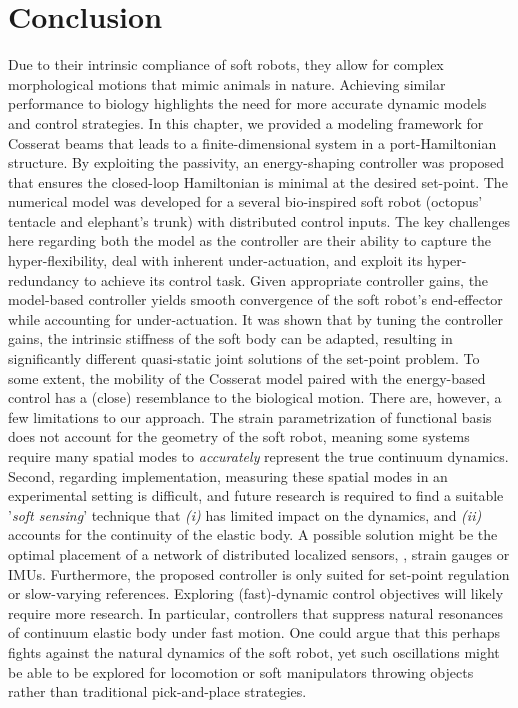 \section{Conclusion}
\label{sec:C3:conclusion}
Due to their intrinsic compliance of soft robots, they allow for complex morphological motions that mimic animals in nature. Achieving similar performance to biology highlights the need for more accurate dynamic models and control strategies. In this chapter, we provided a modeling framework for Cosserat beams that leads to a finite-dimensional system in a port-Hamiltonian structure. By exploiting the passivity, an energy-shaping controller was proposed that ensures the closed-loop Hamiltonian is minimal at the desired set-point. The numerical model was developed for a several bio-inspired soft robot (octopus' tentacle and elephant's trunk) with distributed control inputs. The key challenges here regarding both the model as the controller are their ability to capture the hyper-flexibility, deal with inherent under-actuation, and exploit its hyper-redundancy to achieve its control task. Given appropriate controller gains, the model-based controller yields smooth convergence of the soft robot's end-effector while accounting for under-actuation. It was shown that by tuning the controller gains, the intrinsic stiffness of the soft body can be adapted, resulting in significantly different quasi-static joint solutions of the set-point problem. To some extent, the mobility of the Cosserat model paired with the energy-based control has a (close) resemblance to the biological motion.  There are, however, a few limitations to our approach. The strain parametrization of functional basis does not account for the geometry of the soft robot, meaning some systems require many spatial modes to \textit{accurately} represent the true continuum dynamics. Second, regarding implementation, measuring these spatial modes in an experimental setting is difficult, and future research is required to find a suitable '\textit{soft sensing}' technique that  \textit{(i)} has limited impact on the dynamics, and \textit{(ii)} accounts for the continuity of the elastic body. A possible solution might be the optimal placement of a network of distributed localized sensors, \eg, strain gauges or IMUs. Furthermore, the proposed controller is only suited for set-point regulation or slow-varying references. Exploring (fast)-dynamic control objectives will likely require more research. In particular, controllers that suppress natural resonances of continuum elastic body under fast motion. One could argue that this perhaps fights against the natural dynamics of the soft robot, yet such oscillations might be able to be explored for locomotion or soft manipulators throwing objects rather than traditional pick-and-place strategies.

